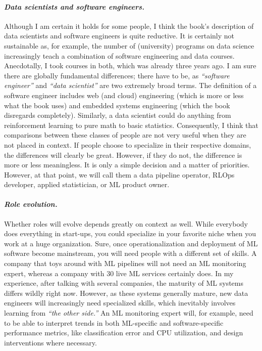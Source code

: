     \paragraph{\textit{Data scientists and software engineers.}} Although I am certain it holds for some people, I think the book's description of data scientists and software engineers is quite reductive.
    It is certainly not sustainable as, for example, the number of (university) programs on data science increasingly teach a combination of software engineering and data courses.
    Anecdotally, I took courses in both, which was already three years ago.
    I am sure there are globally fundamental differences; there have to be, as \textit{``software engineer''} and \textit{``data scientist''} are two extremely broad terms.
    The definition of a software engineer includes web (and cloud) engineering (which is more or less what the book uses) and embedded systems engineering (which the book disregards completely).
    Similarly, a data scientist could do anything from reinforcement learning to pure math to basic statistics.
    Consequently, I think that comparisons between these classes of people are not very useful when they are not placed in context.
    If people choose to specialize in their respective domains, the differences will clearly be great.
    However, if they do not, the difference is more or less meaningless.
    It is only a simple decision and a matter of priorities.
    However, at that point, we will call them a data pipeline operator, RLOps developer, applied statistician, or ML product owner.


    \paragraph{\textit{Role evolution.}} Whether roles will evolve depends greatly on context as well.
    While everybody does everything in start-ups, you could specialize in your favorite niche when you work at a huge organization.
    Sure, once operationalization and deployment of ML software become mainstream, you will need people with a different set of skills.
    A company that toys around with ML pipelines will not need an ML monitoring expert, whereas a company with 30 live ML services certainly does.
    In my experience, after talking with several companies, the maturity of ML systems differs wildly right now. 
    However, as these systems generally mature, new data engineers will increasingly need specialized skills, which inevitably involves learning from \textit{``the other side.''}
    An ML monitoring expert will, for example, need to be able to interpret trends in both ML-specific and software-specific performance metrics, like classification error and CPU utilization, and design interventions where necessary.
    

